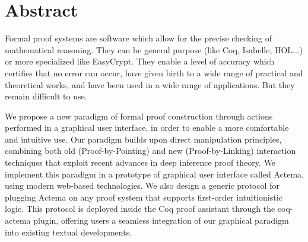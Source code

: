 \dedication{
	The ultimate meaning of logic is this ability to manipulate.
	\flushright -- Jean-Yves Girard.
}


\maketitle


\chapter*{Abstract}

Formal proof systems are software which allow for the precise checking of
mathematical reasoning. They can be general purpose (like Coq, Isabelle, HOL...)
or more specialized like EasyCrypt. They enable a level of accuracy which
certifies that no error can occur, have given birth to a wide range of practical
and theoretical works, and have been used in a wide range of applications. But
they remain difficult to use.

We propose a new paradigm of formal proof construction through actions performed
in a graphical user interface, in order to enable a more comfortable and
intuitive use. Our paradigm builds upon direct manipulation principles,
combining both old (Proof-by-Pointing) and new (Proof-by-Linking) interaction
techniques that exploit recent advances in deep inference proof theory. We
implement this paradigm in a prototype of graphical user interface called
Actema, using modern web-based technologies. We also design a generic protocol
for plugging Actema on any proof system that supports first-order intuitionistic
logic. This protocol is deployed inside the Coq proof assistant through the
coq-actema plugin, offering users a seamless integration of our graphical
paradigm into existing textual developments.

